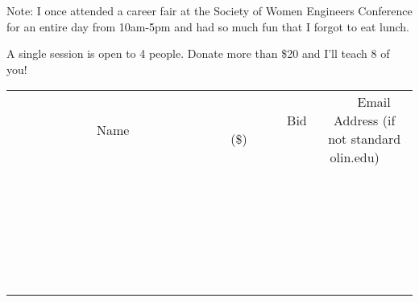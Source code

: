 \documentclass[11pt]{article}
\begin{document}
Note: I once attended a career fair at the Society of Women Engineers Conference for an entire day from 10am-5pm and had so much fun that I forgot to eat lunch.

A single session is open to 4 people. Donate more than \$20 and I'll teach 8 of you!
\\[6ex]
\begin{tabular}{c c c}
~~~~~~~~~~~~~Name~~~~~~~~~~~~~ & ~~~~~~~~~Bid (\$)~~~~~~~~~  & ~~~Email Address (if not standard olin.edu)~~~\\
 & & \\
\hline
 & & \\
\hline
 & & \\
\hline
 & & \\
\hline
 & & \\
\hline
 & & \\
\hline
 & & \\
\hline
 & & \\
\hline
 & & \\
\hline
 & & \\
\hline
 & & \\
\hline
 & & \\
\hline
 & & \\
\hline
 & & \\
\hline
 & & \\
\hline
 & & \\
\hline
 & & \\
\hline
 & & \\
\hline
 & & \\
\hline
 & & \\
\hline
 & & \\
\hline
 & & \\
\hline
 & & \\
\hline
 & & \\
\hline
 & & \\
\hline
 & & \\
\hline
\end{tabular}
\newpage
\end{document}
